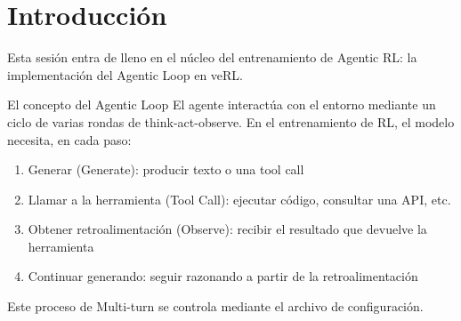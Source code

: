 \section{Introducción}
Esta sesión entra de lleno en el núcleo del entrenamiento de Agentic RL: la implementación del Agentic Loop en veRL.

\begin{importantbox}{El concepto del Agentic Loop}
El agente interactúa con el entorno mediante un ciclo de varias rondas de think-act-observe. En el entrenamiento de RL, el modelo necesita, en cada paso:
\begin{enumerate}
  \item Generar (Generate): producir texto o una tool call
  \item Llamar a la herramienta (Tool Call): ejecutar código, consultar una API, etc.
  \item Obtener retroalimentación (Observe): recibir el resultado que devuelve la herramienta
  \item Continuar generando: seguir razonando a partir de la retroalimentación
\end{enumerate}
Este proceso de Multi-turn se controla mediante el archivo de configuración.
\end{importantbox}

